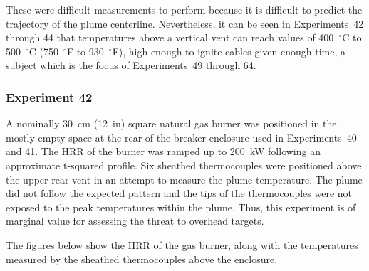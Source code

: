 These were difficult measurements to perform because it is difficult to predict the trajectory of the plume centerline. Nevertheless, it can be seen in Experiments~42 through 44 that temperatures above a vertical vent can reach values of 400~$^\circ$C to 500~$^\circ$C (750~$^\circ$F to 930~$^\circ$F), high enough to ignite cables given enough time, a subject which is the focus of Experiments~49 through 64.



\clearpage


\subsubsection{Experiment 42}

A nominally 30~cm (12~in) square natural gas burner was positioned in the mostly empty space at the rear of the breaker enclosure used in Experiments~40 and 41. The HRR of the burner was ramped up to 200~kW following an approximate t-squared profile. Six sheathed thermocouples were positioned above the upper rear vent in an attempt to measure the plume temperature. The plume did not follow the expected pattern and the tips of the thermocouples were not exposed to the peak temperatures within the plume. Thus, this experiment is of marginal value for assessing the threat to overhead targets.

The figures below show the HRR of the gas burner, along with the temperatures measured by the sheathed thermocouples above the enclosure.

